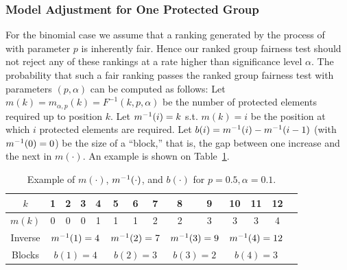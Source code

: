 \subsubsection{Model Adjustment for One Protected Group}\label{subsubsec:adjustment-binomial}
For the binomial case we assume that a ranking generated by the process of~\citet{yang2016measuring} with parameter $p$ is inherently fair.
%
Hence our ranked group fairness test should not reject any of these rankings at a rate higher than significance level $\alpha$.
%
The probability that such a fair ranking passes the ranked group fairness test with parameters $(p,\alpha)$ can be computed as follows:
%
Let $m(k) = m_{\alpha,p}(k) = F^{-1}(k,p,\alpha)$ be the number of protected elements required up to position $k$.
%
Let $m^{-1}(i) = k$ s.t. $m(k) = i$ be the position at which $i$ protected elements are required.
%
Let $b(i) = m^{-1}(i) - m^{-1}(i-1)$ (with $m^{-1}(0) = 0$) be the size of a ``block,'' that is, the gap between one increase and the next in $m(\cdot)$.
%
An example is shown on Table~\ref{tbl:example_mtable}.
%
\begin{table}[h]
	\caption{Example of $m(\cdot)$, $m^{-1}(\cdot)$, and $b(\cdot)$ for $p=0.5, \alpha=0.1$.}
	\vspace{-3mm}
	\label{tbl:example_mtable}
	{\small
		\begin{tabular}{cccccccccccccc}\toprule
			$k$    & 1 & 2 & 3 & {\bf 4} & 5 & 6 & {\bf 7} & 8 & {\bf 9} & 10 & 11 & {\bf 12} \\
			\midrule
			$m(k)$ & 0 & 0 & 0 & \multicolumn{1}{c|}{1} & 1 & 1 & \multicolumn{1}{c|}{2} & 2 & \multicolumn{1}{c|}{3} & 3  & 3  & \multicolumn{1}{c}{4}\\
			Inverse   & \multicolumn{4}{c|}{$m^{-1}(1)=4$}
			& \multicolumn{3}{c|}{$m^{-1}(2)=7$}
			& \multicolumn{2}{c|}{$m^{-1}(3)=9$}
			& \multicolumn{3}{c}{$m^{-1}(4)=12$}\\
			Blocks       & \multicolumn{4}{c|}{$b(1)=4$}
			& \multicolumn{3}{c|}{$b(2)=3$}
			& \multicolumn{2}{c|}{$b(3)=2$}
			& \multicolumn{3}{c}{$b(4)=3$}\\\bottomrule
		\end{tabular}
	}
\end{table}

